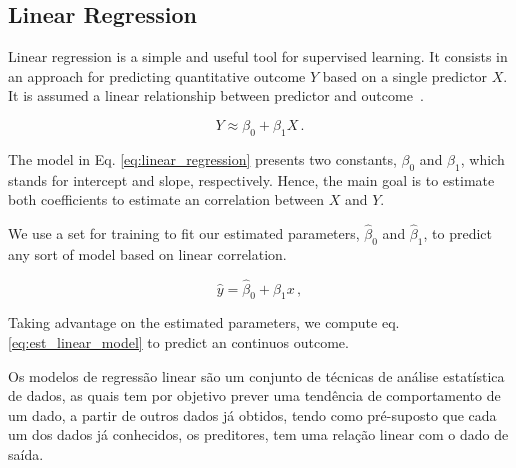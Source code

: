 \subsection{Linear Regression}

Linear regression is a simple and useful tool for supervised learning. It consists in an approach for predicting  quantitative outcome $Y$ based on a single predictor $X$. It is assumed a linear relationship between predictor and outcome~\cite{James2013}.

\begin{equation}
Y \approx \beta_0 + \beta_1 X \, . \label{eq:linear_regression}
\end{equation}

The model in Eq. \ref{eq:linear_regression} presents two constants, $\beta_0$ and $\beta_1$, which stands for intercept and slope, respectively. Hence, the main goal is to estimate both coefficients to estimate an correlation between $X$ and $Y$.

We use a set for training to fit our estimated parameters, $\hat{\beta}_{0}$ and $\hat{\beta}_{1}$, to predict any sort of model based on linear correlation.

\begin{equation}
\hat{y} = \hat{\beta}_{0} + \hat{\beta}_{1}x  \, ,
\label{eq:est_linear_model}
\end{equation}

Taking advantage on the estimated parameters, we compute eq. \ref{eq:est_linear_model} to predict an continuos outcome.

Os modelos de regressão linear são um conjunto de técnicas de análise estatística de dados, as quais tem por objetivo prever uma tendência de comportamento de um dado, a partir de outros dados já obtidos, tendo como pré-suposto que cada um dos dados já conhecidos, os preditores, tem uma relação linear com o dado de saída.


